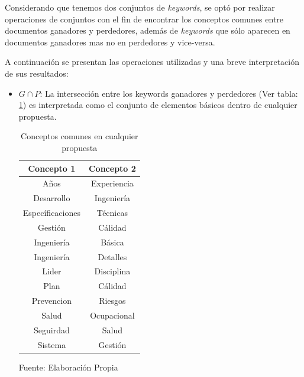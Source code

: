     Considerando que tenemos dos conjuntos de \textit{keywords}, se optó por realizar operaciones de conjuntos con el fin de encontrar los conceptos comunes entre documentos ganadores y perdedores, además de \textit{keywords} que sólo aparecen en documentos ganadores mas no en perdedores y vice-versa.
    
    A continuación se presentan las operaciones utilizadas y una breve interpretación de sus resultados:
    
    \begin{itemize}
        \item $G \cap P$: La intersección entre los keywords ganadores y perdedores (Ver tabla: \ref{table:Conceptos_comunes}) es interpretada como el conjunto de elementos básicos dentro de cualquier propuesta. 
        
        \begin{table}[H]
        \centering
        \begin{tabular}{|c|c|}
        \hline
        \textbf{Concepto 1} & \textbf{Concepto 2} \\ \hline
        Años                & Experiencia         \\ \hline
        Desarrollo          & Ingeniería          \\ \hline
        Específicaciones    & Técnicas            \\ \hline
        Gestión             & Cálidad             \\ \hline
        Ingeniería          & Básica              \\ \hline
        Ingeniería          & Detalles            \\ \hline
        Lider               & Disciplina          \\ \hline
        Plan                & Cálidad             \\ \hline
        Prevencion          & Riesgos             \\ \hline
        Salud               & Ocupacional         \\ \hline
        Seguirdad           & Salud               \\ \hline
        Sistema             & Gestión             \\ \hline
        \end{tabular}
        \caption{\label{table:Conceptos_comunes} Conceptos comunes en cualquier propuesta} Fuente: Elaboración Propia
        \end{table}
        

\end{itemize}
